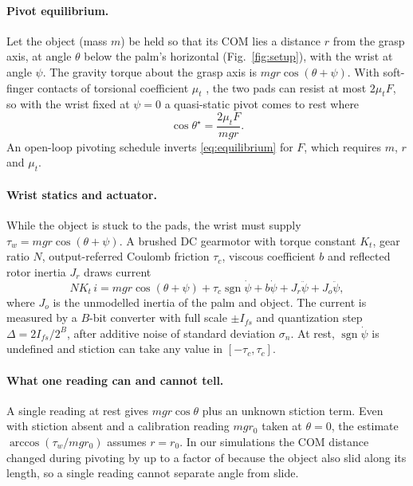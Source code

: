 \documentclass[11pt]{article}
\newcommand{\sgn}{\operatorname{sgn}}
\begin{document}
\paragraph{Pivot equilibrium.} Let the object (mass $m$) be held so that its COM lies a distance $r$ from the grasp axis, at angle $\theta$ below the palm's horizontal (Fig.~\ref{fig:setup}), with the wrist at angle $\psi$. The gravity torque about the grasp axis is $mgr\cos(\theta+\psi)$. With soft-finger contacts of torsional coefficient $\mu_t$ \cite{xydas1999}, the two pads can resist at most $2\mu_t F$, so with the wrist fixed at $\psi=0$ a quasi-static pivot comes to rest where
\begin{equation}
\cos\theta^\star = \frac{2\mu_t F}{mgr}. \label{eq:equilibrium}
\end{equation}
An open-loop pivoting schedule inverts \eqref{eq:equilibrium} for $F$, which requires $m$, $r$ and $\mu_t$.

\paragraph{Wrist statics and actuator.} While the object is stuck to the pads, the wrist must supply $\tau_w = mgr\cos(\theta+\psi)$. A brushed DC gearmotor with torque constant $K_t$, gear ratio $N$, output-referred Coulomb friction $\tau_c$, viscous coefficient $b$ and reflected rotor inertia $J_r$ draws current
\begin{equation}
N K_t\, i = mgr\cos(\theta+\psi) + \tau_c \sgn\dot\psi + b\dot\psi + J_r\ddot\psi + J_o\ddot\psi, \label{eq:motor}
\end{equation}
where $J_o$ is the unmodelled inertia of the palm and object. The current is measured by a $B$-bit converter with full scale $\pm I_{fs}$ and quantization step $\Delta = 2I_{fs}/2^B$, after additive noise of standard deviation $\sigma_n$. At rest, $\sgn\dot\psi$ is undefined and stiction can take any value in $[-\tau_c,\tau_c]$.

\paragraph{What one reading can and cannot tell.} A single reading at rest gives $mgr\cos\theta$ plus an unknown stiction term. Even with stiction absent and a calibration reading $mgr_0$ taken at $\theta=0$, the estimate $\arccos(\tau_w/mgr_0)$ assumes $r=r_0$. In our simulations the COM distance changed during pivoting by up to a factor of \ArOverDhi{} because the object also slid along its length, so a single reading cannot separate angle from slide.
\end{document}
